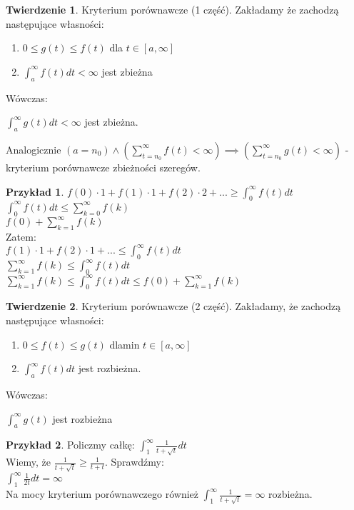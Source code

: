 \documentclass{article}
\theoremstyle{definition}
\theoremstyle{definition}
\newtheorem{tw}{Twierdzenie}[subsection]
\theoremstyle{definition}
\newtheorem{pk}{Przykład}[subsection]
\theoremstyle{definition}
\begin{document}
\begin{tw}
    Kryterium porównawcze (1 część).
    Zakładamy że zachodzą następujące własności:
    \begin{enumerate}
        \item $0\leq g(t)\leq f(t)$ dla $t\in[a,\infty]$
        \item $\int_{a}^{\infty} f(t) dt < \infty$ jest zbieżna
    \end{enumerate}
    Wówczas:
    \begin{center}
        $\int_{a}^{\infty} g(t) dt < \infty$ jest zbieżna.
    \end{center}
    Analogicznie $\left(a=n_0\right)\land\left(\sum_{t=n_0}^{\infty} f(t)<\infty \right)\implies\left(\sum_{t=n_0}^{\infty} g(t)<\infty \right)$ - kryterium porównawcze zbieżności szeregów.
\end{tw}

\begin{pk}
    $f(0)\cdot 1 + f(1)\cdot 1 + f(2)\cdot 2 + ... \geq \int_{0}^{\infty} f(t) dt$\\
    $\int_{0}^{\infty} f(t)dt \leq \sum_{k=0}^{\infty} f(k)$\\
    $f(0)+ \sum_{k=1}^{\infty} f(k)$\\
    Zatem:\\
    $f(1)\cdot 1 + f(2)\cdot 1 + ... \leq \int_{0}^{\infty} f(t) dt$\\
    $\sum_{k=1}^{\infty} f(k) \leq \int_{0}^{\infty} f(t) dt$\\
    $\sum_{k=1}^{\infty} f(k) \leq \int_{0}^{\infty} f(t) dt \leq f(0) + \sum_{k=1}^{\infty} f(k)$
\end{pk}

\begin{tw}
    Kryterium porównawcze (2 część).
    Zakładamy, że zachodzą następujące własności:
    \begin{enumerate}
        \item $0\leq f(t) \leq g(t)$ dlamin $t\in[a,\infty]$
        \item $\int_{a}^{\infty} f(t) dt$ jest rozbieżna.
    \end{enumerate}
    Wówczas:
    \begin{center}
        $\int_{a}^{\infty} g(t)$ jest rozbieżna
    \end{center}
\end{tw}

\begin{pk}
    Policzmy całkę:
    $\int_{1}^{\infty} \frac{1}{t+\sqrt{t}} dt$\\
    Wiemy, że $\frac{1}{t+\sqrt{t}}\geq \frac{1}{t+t}$. Sprawdźmy:\\
    $\int_{1}^{\infty} \frac{1}{2t} dt = \infty$\\
    Na mocy kryterium porównawczego również $\int_{1}^{\infty} \frac{1}{t+\sqrt{t}}=\infty$ rozbieżna.
\end{pk}
\end{document}
